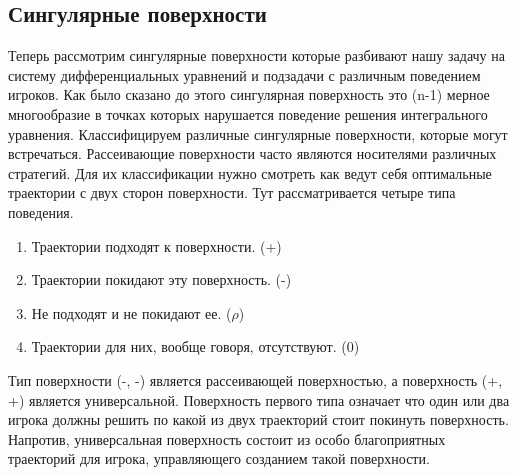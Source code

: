 \documentclass[14pt,a4paper]{extarticle}
\begin{document}
	\subsection{Сингулярные поверхности}
	Теперь рассмотрим сингулярные поверхности которые разбивают нашу задачу на систему дифференциальных уравнений и подзадачи с различным поведением игроков. Как было сказано до этого сингулярная поверхность это (n-1) мерное многообразие в точках которых нарушается поведение решения интегрального уравнения.
	Классифицируем различные сингулярные поверхности, которые могут встречаться. Рассеивающие поверхности часто являются носителями различных стратегий. Для их классификации нужно смотреть как ведут себя оптимальные траектории с двух сторон поверхности. Тут рассматривается четыре типа поведения. 
	\begin{enumerate}
		\item Траектории подходят к поверхности. (+)
		\item Траектории покидают эту поверхность. (-) 
		\item Не подходят и не покидают ее. ($\rho$)
		\item Траектории для них, вообще говоря, отсутствуют. (0)
	\end{enumerate}
	Тип поверхности (-, -) является рассеивающей поверхностью, а поверхность (+, +) является универсальной. Поверхность первого типа означает что один или два игрока должны решить по какой из двух траекторий стоит покинуть поверхность. Напротив, универсальная поверхность состоит из особо благоприятных траекторий для игрока, управляющего созданием такой поверхности. 
	
\end{document}
